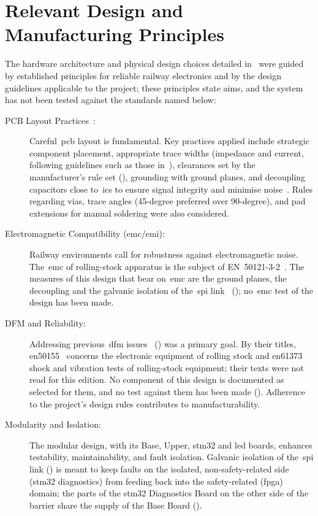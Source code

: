 \section{Relevant Design and Manufacturing Principles}
\label{sec:design_principles}
The hardware architecture and physical design choices detailed in~ were guided by established principles for reliable railway electronics and by the design guidelines applicable to the project; these principles state aims, and the system has not been tested against the standards named below:
\begin{description}
	\item[PCB Layout Practices~\cite{jones2004}:] Careful~\gls{pcb} layout is fundamental. Key practices applied include strategic component placement, appropriate trace widths (impedance and current, following guidelines such as those in~\cite[pp.~7, 10, 12]{jones2004}), clearances set by the manufacturer's rule set (), grounding with ground planes, and decoupling capacitors close to~\glspl{ic} to ensure signal integrity and minimise noise~\cite[Sec.~Tracks, Pads, Clearances, Grounding, Bypassing]{jones2004}. Rules regarding vias, trace angles (45-degree preferred over 90-degree), and pad extensions for manual soldering were also considered.
	\item[Electromagnetic Compatibility (\gls{emc}/\gls{emi}):] Railway environments call for robustness against electromagnetic noise. The~\gls{emc} of rolling-stock apparatus is the subject of \mbox{EN~50121-3-2}~\cite{en50121_3_2_2016}. The measures of this design that bear on~\gls{emc} are the ground planes, the decoupling and the galvanic isolation of the~\gls{spi} link~\cite{ott2009emc} (); no~\gls{emc} test of the design has been made.
	\item[DFM and Reliability:] {\sloppy Addressing previous~\gls{dfm} issues~\cite{leyer2023} () was a primary goal. By their titles, \gls{en50155}~\cite{en50155_2021} concerns the electronic equipment of rolling stock and \gls{en61373}~\cite{en61373_2010} shock and vibration tests of rolling-stock equipment; their texts were not read for this edition. No component of this design is documented as selected for them, and no test against them has been made (). Adherence to the project's design rules contributes to manufacturability.\par}
	\item[Modularity and Isolation:] The modular design, with its Base, Upper, \gls{stm32} and \gls{led} boards, enhances testability, maintainability, and fault isolation. Galvanic isolation of the~\gls{spi} link () is meant to keep faults on the isolated, non-safety-related side (\gls{stm32} diagnostics) from feeding back into the safety-related (\gls{fpga}) domain; the parts of the \gls{stm32} Diagnostics Board on the other side of the barrier share the supply of the Base Board ().

\end{description}
